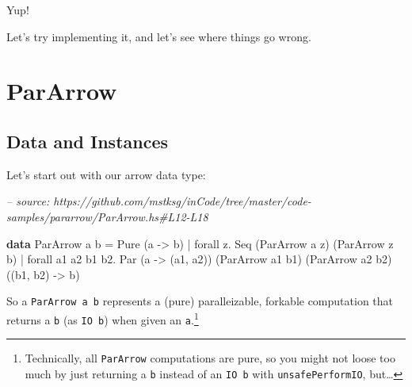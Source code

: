 \documentclass[]{article}
\newenvironment{Shaded}{}{}
\newcommand{\CommentTok}[1]{\textcolor[rgb]{0.38,0.63,0.69}{\textit{#1}}}
\newcommand{\DataTypeTok}[1]{\textcolor[rgb]{0.56,0.13,0.00}{#1}}
\newcommand{\FunctionTok}[1]{\textcolor[rgb]{0.02,0.16,0.49}{#1}}
\newcommand{\KeywordTok}[1]{\textcolor[rgb]{0.00,0.44,0.13}{\textbf{#1}}}
\newcommand{\NormalTok}[1]{#1}
\newcommand{\OtherTok}[1]{\textcolor[rgb]{0.00,0.44,0.13}{#1}}
\begin{document}
Yup!

Let's try implementing it, and let's see where things go wrong.

\hypertarget{pararrow}{%
\section{ParArrow}\label{pararrow}}

\hypertarget{data-and-instances}{%
\subsection{Data and Instances}\label{data-and-instances}}

Let's start out with our arrow data type:

\begin{Shaded}
\begin{Highlighting}[]
\CommentTok{-- source: https://github.com/mstksg/inCode/tree/master/code-samples/pararrow/ParArrow.hs#L12-L18}

\KeywordTok{data} \DataTypeTok{ParArrow}\NormalTok{ a b }\FunctionTok{=}                     \DataTypeTok{Pure}\NormalTok{  (a }\OtherTok{->}\NormalTok{ b)}
                  \FunctionTok{|}\NormalTok{ forall z}\FunctionTok{.}           \DataTypeTok{Seq}\NormalTok{   (}\DataTypeTok{ParArrow}\NormalTok{ a z)}
\NormalTok{                                              (}\DataTypeTok{ParArrow}\NormalTok{ z b)}
                  \FunctionTok{|}\NormalTok{ forall a1 a2 b1 b2}\FunctionTok{.} \DataTypeTok{Par}\NormalTok{   (a }\OtherTok{->}\NormalTok{ (a1, a2))}
\NormalTok{                                              (}\DataTypeTok{ParArrow}\NormalTok{ a1 b1)}
\NormalTok{                                              (}\DataTypeTok{ParArrow}\NormalTok{ a2 b2)}
\NormalTok{                                              ((b1, b2) }\OtherTok{->}\NormalTok{ b)}
\end{Highlighting}
\end{Shaded}

So a \texttt{ParArrow\ a\ b} represents a (pure) paralleizable, forkable
computation that returns a \texttt{b} (as \texttt{IO\ b}) when given an
\texttt{a}.\footnote{Technically, all \texttt{ParArrow} computations are pure,
  so you might not loose too much by just returning a \texttt{b} instead of an
  \texttt{IO\ b} with \texttt{unsafePerformIO}, but\ldots{}}
\end{document}
